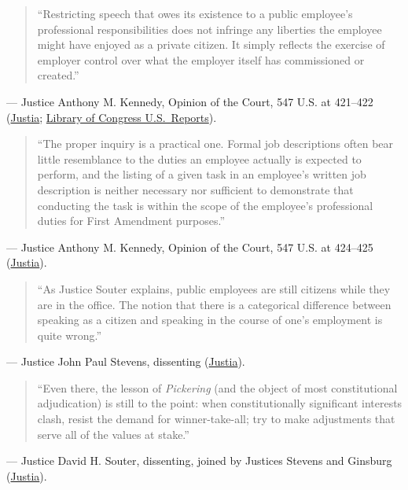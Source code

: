 \documentclass[12pt]{article}
\begin{document}
\begin{quote}
``Restricting speech that owes its existence to a public employee's professional responsibilities does not infringe any liberties the employee might have enjoyed as a private citizen. It simply reflects the exercise of employer control over what the employer itself has commissioned or created.''
\end{quote}
\noindent --- Justice Anthony M. Kennedy, Opinion of the Court, 547 U.S. at 421--422 (\href{https://supreme.justia.com/cases/federal/us/547/410/}{Justia}; \href{https://tile.loc.gov/storage-services/service/ll/usrep/usrep547/usrep547410/usrep547410.pdf}{Library of Congress U.S.\ Reports}).

\begin{quote}
``The proper inquiry is a practical one. Formal job descriptions often bear little resemblance to the duties an employee actually is expected to perform, and the listing of a given task in an employee's written job description is neither necessary nor sufficient to demonstrate that conducting the task is within the scope of the employee's professional duties for First Amendment purposes.''
\end{quote}
\noindent --- Justice Anthony M. Kennedy, Opinion of the Court, 547 U.S. at 424--425 (\href{https://supreme.justia.com/cases/federal/us/547/410/}{Justia}).

\begin{quote}
``As Justice Souter explains, public employees are still citizens while they are in the office. The notion that there is a categorical difference between speaking as a citizen and speaking in the course of one's employment is quite wrong.''
\end{quote}
\noindent --- Justice John Paul Stevens, dissenting (\href{https://supreme.justia.com/cases/federal/us/547/410/}{Justia}).

\begin{quote}
``Even there, the lesson of \textit{Pickering} (and the object of most constitutional adjudication) is still to the point: when constitutionally significant interests clash, resist the demand for winner-take-all; try to make adjustments that serve all of the values at stake.''
\end{quote}
\noindent --- Justice David H. Souter, dissenting, joined by Justices Stevens and Ginsburg (\href{https://supreme.justia.com/cases/federal/us/547/410/}{Justia}).
\end{document}
